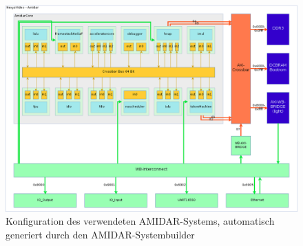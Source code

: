 \begin{figure}
	\centering
	\includegraphics[width = 1\textwidth]{Graphics/system.png}
	\caption{Konfiguration des verwendeten AMIDAR-Systems, automatisch generiert durch den AMIDAR-Systembuilder}

\end{figure}

